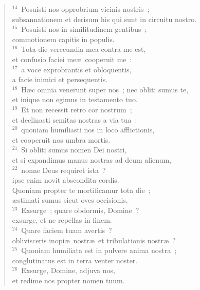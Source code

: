 \begin{flushleft}
\begin{verse}
${}^{14}$~Posuisti nos opprobrium vicinis nostris~;\\ subsannationem et derisum his qui sunt in circuitu nostro.\\
${}^{15}$~Posuisti nos in similitudinem gentibus~;\\ commotionem capitis in populis.\\
${}^{16}$~Tota die verecundia mea contra me est,\\ et confusio faciei me\ae\ cooperuit me~:\\
${}^{17}$~a voce exprobrantis et obloquentis,\\ a facie inimici et persequentis.\\
${}^{18}$~H\ae c omnia venerunt super nos~; nec obliti sumus te,\\ et inique non egimus in testamento tuo.\\
${}^{19}$~Et non recessit retro cor nostrum~;\\ et declinasti semitas nostras a via tua~:\\
${}^{20}$~quoniam humiliasti nos in loco afflictionis,\\ et cooperuit nos umbra mortis.\\
${}^{21}$~Si obliti sumus nomen Dei nostri,\\ et si expandimus manus nostras ad deum alienum,\\
${}^{22}$~nonne Deus requiret ista~?\\ ipse enim novit abscondita cordis.\\ Quoniam propter te mortificamur tota die~;\\ \ae stimati sumus sicut oves occisionis.\\
${}^{23}$~Exsurge~; quare obdormis, Domine~?\\ exsurge, et ne repellas in finem.\\
${}^{24}$~Quare faciem tuam avertis~?\\ oblivisceris inopi\ae\ nostr\ae\ et tribulationis nostr\ae~?\\
${}^{25}$~Quoniam humiliata est in pulvere anima nostra~;\\ conglutinatus est in terra venter noster.\\
${}^{26}$~Exsurge, Domine, adjuva nos,\\ et redime nos propter nomen tuum.\end{verse}\end{flushleft}


